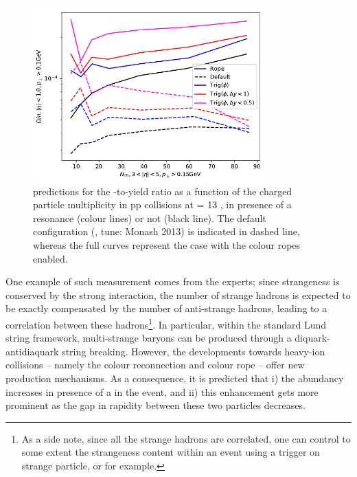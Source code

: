 \begin{figure}[t]
\centering
\includegraphics[width=0.8\textwidth]{Figs/Chapter6/PredictionPythia_Bierlich.png}
\caption{\Pythiaeight predictions for the \rmOmega-to-\rmPiPM yield ratio as a function of the charged particle multiplicity in pp collisions at \sqrtS =  13 \tev, in presence of a \rmPhiMes resonance (colour lines) or not (black line). The default \Pythia configuration (\Pythiaeight, tune: Monash 2013) is indicated in dashed line, whereas the full curves represent the case with the colour ropes enabled.}
	\label{fig:PredictionPythia_Bierlich}
\end{figure}

One example of such measurement comes from the \Pythia experts; since strangeness is conserved by the strong interaction, the number of strange hadrons is expected to be exactly compensated by the number of anti-strange hadrons, leading to a correlation between these hadrons\footnote{As a side note, since all the strange hadrons are correlated, one can control to some extent the strangeness content within an event using a trigger on strange particle, \rmXi or \rmOmega for example.}. In particular, within the standard Lund string framework, multi-strange baryons can be produced through a diquark-antidiaquark string breaking. However, the  developments towards heavy-ion collisions -- namely the colour reconnection and colour rope \cite{christiansenStringFormationLeading2015}\cite{bierlichEffectsOverlappingStrings2015a}\cite{adolfssonQCDChallengesPp2020} -- offer new production mechanisms. As a consequence, it is predicted that i) the \rmOmega abundancy increases in presence of a \rmPhiMes in the event, and ii) this enhancement gets more prominent as the gap in rapidity between these two particles decreases.


